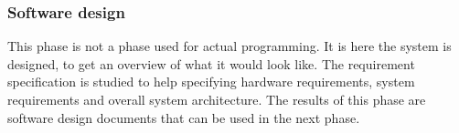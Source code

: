 \subsubsection{Software design}

This phase is not a phase used for actual programming. It is here the system is designed, to 
get an overview of what it would look like. The requirement 
specification is studied to help specifying hardware requirements, system requirements and 
overall system architecture.  The results of this phase are 
software design documents that can be used in the next phase\cite{waterfallexplained}.